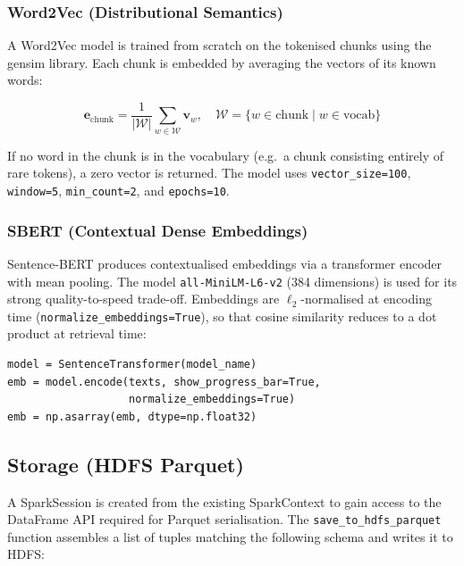 \documentclass[a4paper,11pt]{article}
\begin{document}
\subsubsection{Word2Vec (Distributional Semantics)}

A Word2Vec model is trained from scratch on the tokenised chunks using the
gensim library. Each chunk is embedded by averaging the vectors of its
known words:

\[
  \mathbf{e}_{\text{chunk}} =
  \frac{1}{|\mathcal{W}|} \sum_{w \in \mathcal{W}} \mathbf{v}_w,
  \quad \mathcal{W} = \{w \in \text{chunk} \mid w \in \text{vocab}\}
\]

If no word in the chunk is in the vocabulary (e.g.\ a chunk consisting
entirely of rare tokens), a zero vector is returned. The model uses
\texttt{vector\_size=100}, \texttt{window=5}, \texttt{min\_count=2}, and
\texttt{epochs=10}.

\subsubsection{SBERT (Contextual Dense Embeddings)}

Sentence-BERT produces contextualised embeddings via a transformer encoder
with mean pooling. The model \texttt{all-MiniLM-L6-v2} (384 dimensions) is
used for its strong quality-to-speed trade-off. Embeddings are
$\ell_2$-normalised at encoding time (\texttt{normalize\_embeddings=True}),
so that cosine similarity reduces to a dot product at retrieval time:

\begin{lstlisting}
model = SentenceTransformer(model_name)
emb = model.encode(texts, show_progress_bar=True,
                   normalize_embeddings=True)
emb = np.asarray(emb, dtype=np.float32)
\end{lstlisting}

\subsection{Storage (HDFS Parquet)}

A SparkSession is created from the existing SparkContext to gain access to the
DataFrame API required for Parquet serialisation. The
\texttt{save\_to\_hdfs\_parquet} function assembles a list of tuples
matching the following schema and writes it to HDFS:
\end{document}
